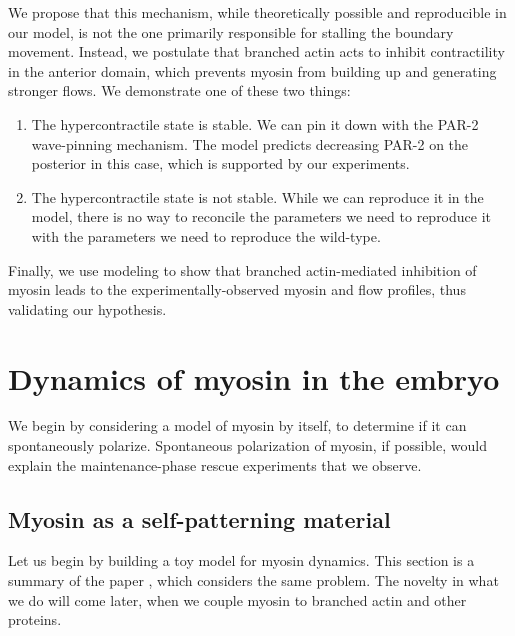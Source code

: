 \documentclass[11pt]{article}
\newcommand{\red}[1]{\color{red}#1\normalcolor}
\newcommand{\6}[1]{#1_{\text{6}}}
\newcommand{\3}[1]{#1_{\text{3}}}
\begin{document}
We propose that this mechanism, while theoretically possible and reproducible in our model, is not the one primarily responsible for stalling the boundary movement. Instead, we postulate that branched actin acts to inhibit contractility in the anterior domain, which prevents myosin from building up and generating stronger flows. We demonstrate \red{one of these two things}:
\begin{enumerate}
\item The hypercontractile state is stable. We can pin it down with the PAR-2 wave-pinning mechanism. The model predicts decreasing PAR-2 on the posterior in this case, which is supported by our experiments. 
\item The hypercontractile state is not stable. While we can reproduce it in the model, there is no way to reconcile the parameters we need to reproduce it with the parameters we need to reproduce the wild-type. 
\end{enumerate}
Finally, we use modeling to show that branched actin-mediated inhibition of myosin leads to the experimentally-observed myosin and flow profiles, thus validating our hypothesis. 

\section{Dynamics of myosin in the embryo \label{sec:myosin}}
We begin by considering a model of myosin by itself, to determine if it can spontaneously polarize. Spontaneous polarization of myosin, if possible, would explain the maintenance-phase rescue experiments that we observe.

\subsection{Myosin as a self-patterning material} 
Let us begin by building a toy model for myosin dynamics. This section is a summary of the paper \cite{bois2011pattern}, which considers the same problem. The novelty in what we do will come later, when we couple myosin to branched actin and other proteins. 
\end{document}
